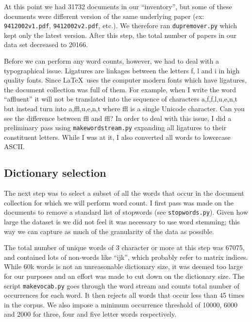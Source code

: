 \documentclass[11pt]{article}
\newcommand{\file}[1]{\texttt{#1}}
\newcommand{\program}[1]{\texttt{#1}}
\begin{document}
        At this point we had 31732 documents in our ``inventory'', but some of these documents
        were different version of the same underlying paper (ex: \file{9412002v1.pdf},
        \file{9412002v2.pdf}, etc.).
        We therefore ran \program{dupremover.py} which kept only the latest version.
        After this step, the total number of papers in our data set decreased to 20166.

        Before we can perform any word counts, however, we had to deal with a typographical issue.
        Ligatures are linkages between the letters f, l and i in high quality fonts.
        Since \LaTeX \ uses the computer modern fonts which have ligatures, the document collection
        was full of them. For example, when I write the word ``affluent'' it will not be translated
        into the sequence of characters a,f,f,l,u,e,n,t but instead turn into a,ffl,u,e,n,t where 
        ffl is a single Unicode character. Can you see the difference between ffl and f{}f{}l?
        In order to deal with this issue, I did a preliminary pass using \program{makewordstream.py}
        expanding all ligatures to their constituent letters. 
        While I was at it, I also converted all words to lowercase ASCII.
		  

    \subsection{Dictionary selection}

        The next step was to select a subset of all the words that occur in the document collection
        for which we will perform word count.
		I first pass was made on the documents to remove a standard list of stopwords (see
        \file{stopwords.py}). 
		Given how large the dataset is we did not feel it was necessary to use word stemming;
        this way we can capture as much of the granularity of the data as possible.

        The total number of unique words of 3 character or more at this step was 67075, and
        contained lots of non-words like ``ijk'', which probably refer to matrix indices.
        While 60k words is not an unreasonable dictionary size, it was deemed too large for
        our purposes and an effort was made to cut down on the dictionary size.
        The script \program{makevocab.py} goes through the word stream and counts total
        number of occurrences for each word. It then rejects all words that occur less than
        45 times in the corpus. 
        We also impose a minimum occurrence threshold of 10000, 6000 and 2000 for three, four and
        five letter words respectively.
\end{document}
